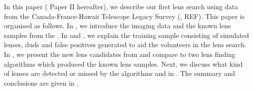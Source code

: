 \documentclass[useAMS,usenatbib,a4paper]{mn2e}
\begin{document}
%
%
%
%
%

In this paper ( Paper II hereafter), we describe our first lens search using
data from the Canada-France-Hawaii Telescope Legacy Survey (\cfhtls, REF).  This
paper is organised as follows. In , we introduce the \cfhtls
imaging data and the known lens samples from the \cfhtls. In  and
, we explain the training sample consisting of simulated lenses,
duds and false positives generated to aid the \sw volunteers in the lens search.
In , we present the new lens candidates from \sw and compare
\sw to two lens finding algorithms which produced the known \cfhtls lens
samples. Next, we discuss what kind of lenses are detected or missed by the
algorithms and \sw in . The summary and conclusions are given
in .
\end{document}
